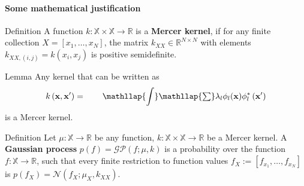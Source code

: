 \begin{frame}{\insertsection}
    \framesubtitle{Some mathematical justification}

    \begin{block}{Definition}
        A function $k:\mathbb{X}\times\mathbb{X} \rightarrow \mathbb{R}$ is a \textcolor{UniBlue}{\textbf{Mercer kernel}}, if for any finite collection $X=\left[x_{1}, \dots, x_{N}\right]$, the matrix $k_{X X} \in \mathbb{R}^{N \times N}$ with elements $k_{X X,(i, j)}=k\left(x_{i}, x_{j}\right)$ is positive semidefinite.
    \end{block}
    
    \begin{block}{Lemma}
        Any kernel that can be written as
        \begin{equation*}
            k\left(\mathbf{x}, \mathbf{x}^{\prime}\right)= \qquad \mathllap{\displaystyle\int}\mathllap{\textstyle\sum} \lambda_{l} \phi_{l}(\mathbf{x}) \phi_{l}^{*}\left(\mathbf{x}^{\prime}\right)
        \end{equation*}
        is a Mercer kernel.
    \end{block}

    \begin{block}{Definition}
        Let $\mu:\mathbb{X}\rightarrow \mathbb{R}$ be any function, $k:\mathbb{X}\times\mathbb{X} \rightarrow \mathbb{R}$ be a Mercer kernel. A \textcolor{UniBlue}{\textbf{Gaussian process}} $p(f)=\mathcal{G} \mathcal{P}(f ; \mu, k)$ is a probability over the function $f : \mathbb{X} \rightarrow \mathbb{R}$, such that every finite restriction to function values $f_{X} :=\left[f_{x_{1}}, \ldots, f_{x_{N}}\right]$ is  $p\left(f_{X}\right)=\mathcal{N}\left(f_{X} ; \mu_{X}, k_{X X}\right)$.
    \end{block}




\end{frame}
